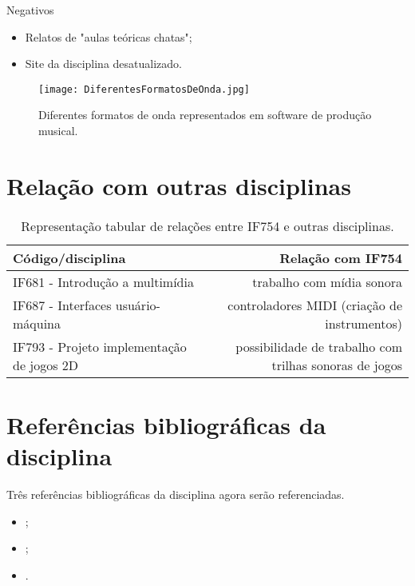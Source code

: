 \documentclass[a4paper]{article}
\begin{document}
Negativos

\begin{itemize}
\item Relatos de "aulas teóricas chatas";
\item Site da disciplina desatualizado.
\end{itemize}

\begin{figure}
\centering
\texttt{[image: DiferentesFormatosDeOnda.jpg]}
\caption{\label{fig:DiferentesFormatosDeOnda}Diferentes formatos de onda representados em software de produção musical.}
\end{figure}
\pagebreak
\section{Relação com outras disciplinas}

\begin{table}[! th]
\centering
\begin{tabular}{l|r}
Código/disciplina & Relação com IF754\\\hline
IF681 - Introdução a multimídia & trabalho com mídia sonora\\
IF687 - Interfaces usuário-máquina & controladores MIDI (criação de instrumentos)\\
IF793 - Projeto implementação de jogos 2D & possibilidade de trabalho com trilhas sonoras de jogos
\end{tabular}
\caption{\label{tab:widgets}Representação tabular de relações entre IF754 e outras disciplinas.}
\end{table}

\section{Referências bibliográficas da disciplina}

Três referências bibliográficas da disciplina agora serão referenciadas.
\begin{itemize}
\item \cite{roads1996computer};
\item \cite{moorer1977signal};
\item \cite{mathews1969technology}.
\end{itemize}



\end{document}

